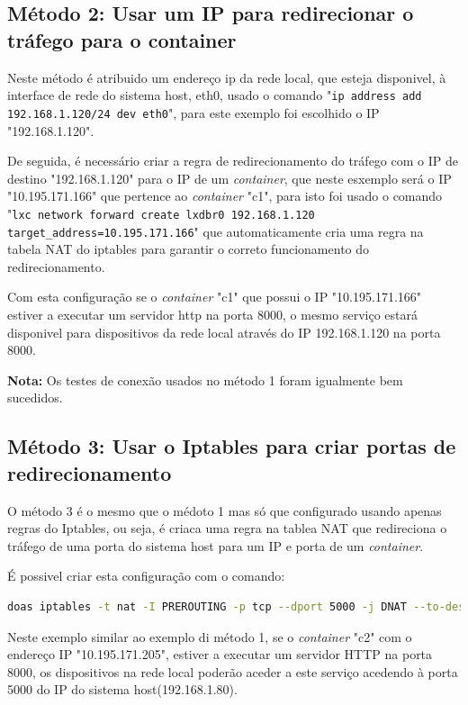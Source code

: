 \subsection{Método 2: Usar um IP para redirecionar o tráfego para o container}

Neste método é atribuido um endereço ip da rede local, que esteja disponivel, à
interface de rede do sistema host, eth0, usado o comando
"\texttt{ip address add 192.168.1.120/24 dev eth0}", para este exemplo foi escolhido o IP
"192.168.1.120".

De seguida, é necessário criar a regra de redirecionamento do tráfego
com o IP de destino "192.168.1.120" para o IP de um \textit{container}, que neste esxemplo será o
IP "10.195.171.166" que pertence ao \textit{container} "c1", para isto foi usado o
comando "\texttt{lxc network forward create lxdbr0 192.168.1.120 target\_address=10.195.171.166}"
que automaticamente cria uma regra na tabela NAT do iptables para garantir o correto
funcionamento do redirecionamento.

Com esta configuração se o \textit{container} "c1" que possui o IP "10.195.171.166" estiver a executar um servidor 
http na porta 8000, o mesmo serviço estará disponivel para dispositivos da rede local
através do IP 192.168.1.120 na porta 8000.

\textbf{Nota:} Os testes de conexão usados no método 1 foram igualmente bem sucedidos.

\subsection{Método 3: Usar o Iptables para criar portas de redirecionamento}

O método 3 é o mesmo que o médoto 1 mas só que configurado usando apenas regras
do Iptables, ou seja, é criaca uma regra na tablea NAT que redireciona o tráfego
de uma porta do sistema host para um IP e porta de um \textit{container}.

É possivel criar esta configuração com o comando:



\begin{lstlisting}[language=Bash, caption={Exemplo de regra de redirecionamento}]
    doas iptables -t nat -I PREROUTING -p tcp --dport 5000 -j DNAT --to-destination 10.195.171.205:8000
\end{lstlisting}



Neste exemplo similar ao exemplo di método 1, se o \textit{container} "c2" com o 
endereço IP "10.195.171.205", estiver a executar um servidor HTTP na porta
8000, os dispositivos na rede local poderão aceder a este serviço acedendo à porta 
5000 do IP do sistema host(192.168.1.80).

